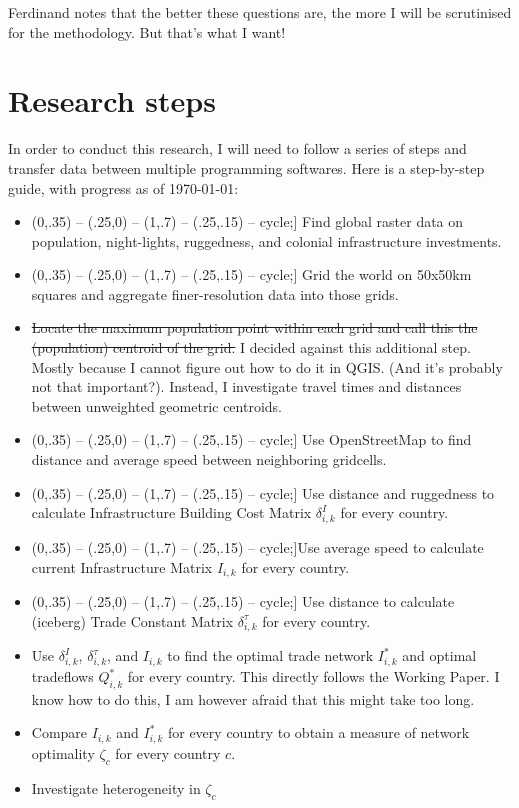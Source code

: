 \documentclass[11pt, oneside]{article}   	%
\def\checkmark{\tikz\fill[scale=0.4](0,.35) -- (.25,0) -- (1,.7) -- (.25,.15) -- cycle;}
\begin{document}
Ferdinand notes that the better these questions are, the more I will be scrutinised for the methodology. But that's what I want!

\section{Research steps}

In order to conduct this research, I will need to follow a series of steps and transfer data between multiple programming softwares. Here is a step-by-step guide, with progress as of \today:



\begin{itemize}
  \item[\checkmark] Find global raster data on population, night-lights, ruggedness, and colonial infrastructure investments.
  \item[\checkmark] Grid the world on 50x50km squares and aggregate finer-resolution data into those grids.
  \item \st{Locate the maximum population point within each grid and call this the (population) centroid of the grid.} I decided against this additional step. Mostly because I cannot figure out how to do it in QGIS. (And it's probably not that important?). Instead, I investigate travel times and distances between unweighted geometric centroids.
  \item[\checkmark] Use OpenStreetMap to find distance and average speed between neighboring gridcells.
  \item[\checkmark] Use distance and ruggedness to calculate Infrastructure Building Cost Matrix $\delta^{I}_{i,k}$ for every country.
  \item[\checkmark]Use average speed to calculate current Infrastructure Matrix $I_{i,k}$ for every country.
  \item[\checkmark] Use distance to calculate (iceberg) Trade Constant Matrix $\delta^{\tau}_{i,k}$ for every country.
  \item Use $\delta^{I}_{i,k}$, $\delta^{\tau}_{i,k}$, and $I_{i,k}$ to find the optimal trade network $I^{*}_{i,k}$ and optimal tradeflows $Q^{*}_{i,k}$ for every country. This directly follows the \cite{fajgelbaum_optimal_2017} Working Paper. I know how to do this, I am however afraid that this might take too long.
  \item Compare $I_{i,k}$ and $I^{*}_{i,k}$ for every country to obtain a measure of network optimality $\zeta_{c}$ for every country $c$.
  \item Investigate heterogeneity in $\zeta_{c}$

\end{itemize}
\end{document}

